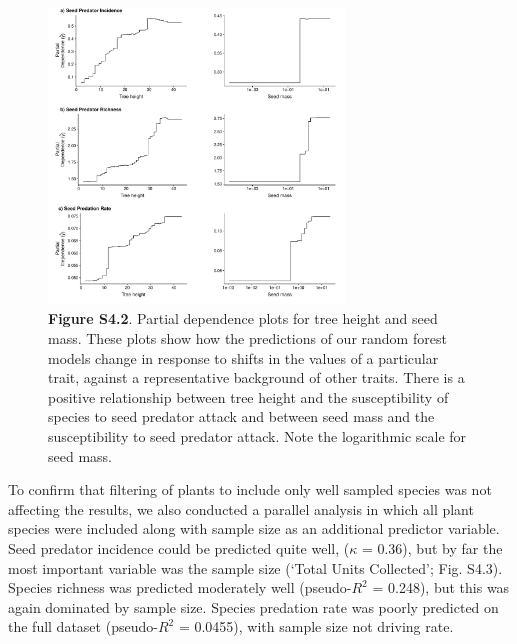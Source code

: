 \documentclass[11pt]{article}
\begin{document}
\begin{figure}[H]
\centering\includegraphics[width=0.7\textwidth]{../Figures/PartialDependencePlots.pdf} 
\caption[]{ \textbf{Figure S4.2}. Partial dependence plots for tree height and seed mass. These plots show how the predictions of our random forest models change in response to shifts in the values of a particular trait, against a representative background of other traits. There is a positive relationship between tree height and the susceptibility of species to seed predator attack and between seed mass and the susceptibility to seed predator attack. Note the logarithmic scale for seed mass.}
\end{figure}

To confirm that filtering of plants to include only well sampled species was not affecting the results, we also conducted a parallel analysis in which all plant species were included along with sample size as an additional predictor variable. Seed predator incidence could be predicted quite well, ($\kappa$ = 0.36), but by far the most important variable was the sample size (‘Total Units Collected’; Fig. S4.3). Species richness was predicted moderately well (pseudo-$R^2$ = 0.248), but this was again dominated by sample size. Species predation rate was poorly predicted on the full dataset (pseudo-$R^2$ = 0.0455), with sample size not driving rate.
\end{document}
